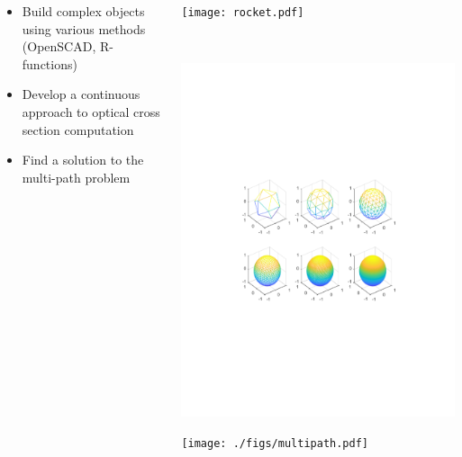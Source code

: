 \documentclass{beamer}
\begin{document}
\begin{frame}[t]
\begin{columns}
\begin{column}{0.5\textwidth}
\begin{itemize} 
\item Build complex objects using various methods (OpenSCAD, R-functions) \vspace*{8mm}
\item Develop a continuous approach to optical cross section computation \vspace*{10mm}
\item Find a solution to the multi-path problem 
\end{itemize} 
\end{column}
\begin{column}{0.5\textwidth}
\vspace{5mm}
\centerline{\texttt{[image: rocket.pdf]}}\\ 
\vspace{5mm}
\centerline{\includegraphics[scale = 0.5]{./figs/icosahedron_single.pdf}}
\vspace{5mm}
\centerline{\texttt{[image: ./figs/multipath.pdf]}}
\end{column}
\end{columns}

\end{frame} 
\end{document}
